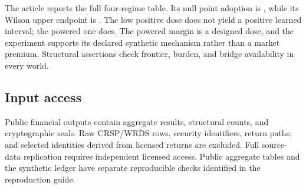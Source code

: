 The article reports the full four-regime table. Its null point adoption is
\AORClosureNullAdoption, while its Wilson upper endpoint is
\AORClosureNullWilsonUpper. The low positive dose does not yield a positive
learned interval; the powered one does. The powered margin is a designed dose,
and the experiment supports its declared synthetic mechanism rather than a
market premium. Structural assertions check frontier, burden, and bridge
availability in every world.

\subsection{Input access}

Public financial outputs contain aggregate results, structural counts, and
cryptographic seals. Raw CRSP/WRDS rows, security identifiers, return paths,
and selected identities derived from licensed returns are excluded. Full
source-data replication requires independent licensed access. Public aggregate
tables and the synthetic ledger have separate reproducible checks identified
in the reproduction guide.
